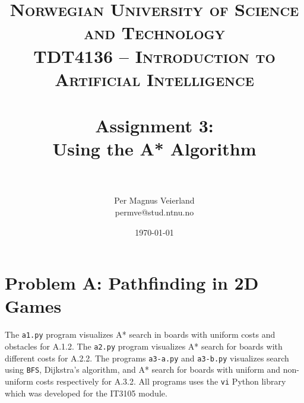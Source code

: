 

\usepackage{float}

\title{	
\normalfont \normalsize 
\textsc{Norwegian University of Science and Technology\\TDT4136 -- Introduction to Artificial Intelligence} \\ [25pt]
\horrule{0.5pt} \\[0.4cm]
\huge Assignment 3:\\ Using the A* Algorithm\\
\horrule{2pt} \\[0.5cm]
}

\author{Per Magnus Veierland\\permve@stud.ntnu.no}

\date{\normalsize\today}


\newcommand{\showboard}[4]{
    \begin{figure}[H]
    \centering
    \texttt{[image: images/\#1-\#2]}
    \caption{#3}
    \end{figure}
}

\newcommand{\showbfs}[2]{\showboard{#1}{breadth_first}{Breadth First Search}{#2}}
\newcommand{\showdijkstra}[2]{\showboard{#1}{dijkstra}{Dijkstra's Algorithm}{#2}}
\newcommand{\showastar}[2]{\showboard{#1}{astar}{A* Search}{#2}}
\newcommand{\showboards}[2]{\showbfs{#1}{#2}\showdijkstra{#1}{#2}\showastar{#1}{#2}}




\maketitle

\section*{Problem A: Pathfinding in 2D Games}

The \texttt{a1.py} program visualizes A* search in boards with uniform costs and obstacles for A.1.2. The \texttt{a2.py} program visualizes A* search for boards with different costs for A.2.2. The programs \texttt{a3-a.py} and \texttt{a3-b.py} visualizes search using \texttt{BFS}, Dijkstra's algorithm, and A* search for boards with uniform and non-uniform costs respectively for A.3.2. All programs uses the \texttt{vi} Python library which was developed for the IT3105 module.


